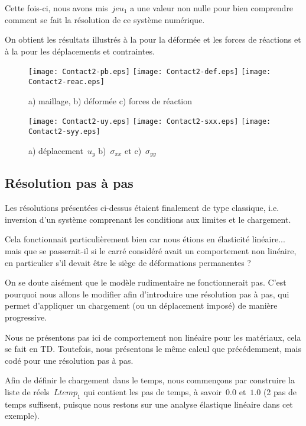 \medskip
Cette fois-ci, nous avons mis~$jeu_1$ a une valeur non nulle pour bien comprendre comment se fait la résolution de ce système numérique.

On obtient les résultats illustrés à la  pour la déformée et les forces de réactions et à la  pour les déplacements et contraintes.

\begin{figure}[ht]
  \texttt{[image: Contact2-pb.eps]} \hfill 
  \texttt{[image: Contact2-def.eps]}\hfill 
  \texttt{[image: Contact2-reac.eps]}
  \caption{\label{Fig-Cont21} a) maillage, b) déformée c) forces de réaction}
\end{figure}

\begin{figure}[ht]
  \texttt{[image: Contact2-uy.eps]} \hfill 
  \texttt{[image: Contact2-sxx.eps]}\hfill 
  \texttt{[image: Contact2-syy.eps]}
  \caption{\label{Fig-Cont22} a) déplacement~$u_y$ b)~$\sigma_{xx}$ et c)~$\sigma_{yy}$}
\end{figure}








\medskip
\subsection{Résolution pas à pas}

Les résolutions présentées ci-dessus étaient finalement de type classique, i.e. inversion d'un système comprenant les conditions aux limites et le chargement.

Cela fonctionnait particulièrement bien car nous étions en élasticité linéaire... mais que se passerait-il si le carré considéré avait un comportement non linéaire, en particulier s'il devait être le siège de déformations permanentes ?

On se doute aisément que le modèle rudimentaire ne fonctionnerait pas. C'est pourquoi nous allons le modifier afin d'introduire une résolution pas à pas, qui permet d'appliquer un chargement (ou un déplacement imposé) de manière progressive.

\medskip
Nous ne présentons pas ici de comportement non linéaire pour les matériaux, cela se fait en TD. Toutefois, nous présentons le même calcul que précédemment, mais codé pour une résolution pas à pas.

\medskip
Afin de définir le chargement dans le temps, nous commençons par construire la liste de réels~$Ltemp_1$ qui contient les pas de temps, à savoir~$0.0$ et~$1.0$ (2 pas de temps suffisent, puisque nous restons sur une analyse élastique linéaire dans cet exemple).

